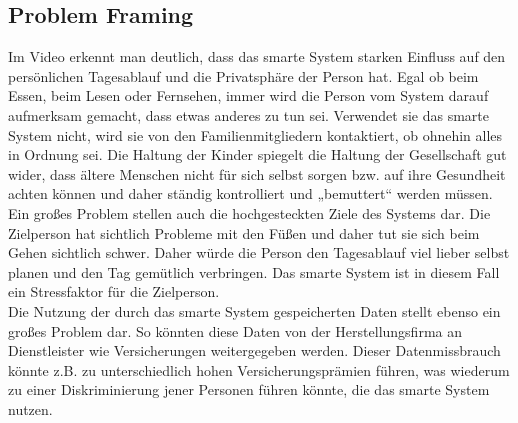 \subsection{Problem Framing}
Im Video erkennt man deutlich, dass das smarte System starken Einfluss auf den persönlichen Tagesablauf und die Privatsphäre der Person hat. Egal ob beim Essen, beim Lesen oder Fernsehen, immer wird die Person vom System darauf aufmerksam gemacht, dass etwas anderes zu tun sei. Verwendet sie das smarte System nicht, wird sie von den Familienmitgliedern kontaktiert, ob ohnehin alles in Ordnung sei. Die Haltung der Kinder spiegelt die Haltung der Gesellschaft gut wider, dass ältere Menschen nicht für sich selbst sorgen bzw. auf ihre Gesundheit achten können und daher ständig kontrolliert und „bemuttert“ werden müssen.  \\
Ein großes Problem stellen auch die hochgesteckten Ziele des Systems dar. Die Zielperson hat sichtlich Probleme mit den Füßen und daher tut sie sich beim Gehen sichtlich schwer. Daher würde die Person den Tagesablauf viel lieber selbst planen und den Tag gemütlich verbringen. Das smarte System ist in diesem Fall ein Stressfaktor für die Zielperson. \\
Die Nutzung der durch das smarte System gespeicherten Daten stellt ebenso ein großes Problem dar. So könnten diese Daten von der Herstellungsfirma an Dienstleister wie Versicherungen weitergegeben werden. Dieser Datenmissbrauch könnte z.B. zu unterschiedlich hohen Versicherungsprämien führen, was wiederum zu einer Diskriminierung jener Personen führen könnte, die das smarte System nutzen.  

